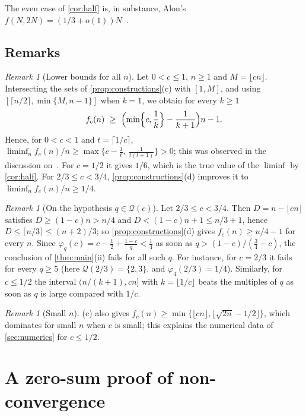 \documentclass[11pt,reqno]{amsart}
\numberwithin{equation}{section}
\theoremstyle{definition}
\theoremstyle{remark}
\newtheorem{remark}[theorem]{Remark}
\newcommand{\floor}[1]{\lfloor #1\rfloor}
\newcommand{\ceil}[1]{\lceil #1\rceil}
\begin{document}
The even case of \cref{cor:half} is, in substance, Alon's $f(N,2N)=(1/3+o(1))N$~\cite[Corollary~2.6]{Al87}.

\subsection{Remarks}

\begin{remark}[Lower bounds for all $n$]\label{rem:liminf}
Let $0<c\le1$, $n\ge1$ and $M=\floor{cn}$. Intersecting the sets of \cref{prop:constructions}(c) with $[1,M]$, and using $[\ceil{n/2},\min\{M,n-1\}]$ when $k=1$, we obtain for every $k\ge1$
\[
 f_c(n)\ \ge\ \Bigl(\min\Bigl\{c,\frac1k\Bigr\}-\frac1{k+1}\Bigr)n-1 .
\]
Hence, for $0<c<1$ and $t=\ceil{1/c}$, $\liminf_{n}f_c(n)/n\ge\max\{c-\frac1t,\ \frac1{t(t+1)}\}>0$; this was observed in the discussion on~\cite{Bl}. For $c=1/2$ it gives $1/6$, which is the true value of the $\liminf$ by \cref{cor:half}. For $2/3\le c<3/4$, \cref{prop:constructions}(d) improves it to $\liminf_n f_c(n)/n\ge1/4$.
\end{remark}

\begin{remark}[On the hypothesis $q\in\mathcal Q(c)$]\label{rem:intervals}
Let $2/3\le c<3/4$. Then $D=n-\floor{cn}$ satisfies $D\ge(1-c)n>n/4$ and $D<(1-c)n+1\le n/3+1$, hence $D\le\ceil{n/3}\le(n+2)/3$; so \cref{prop:constructions}(d) gives $f_c(n)\ge n/4-1$ for every $n$. Since $\varphi_q(c)=c-\frac12+\frac{1-c}q<\frac14$ as soon as $q>(1-c)/(\frac34-c)$, the conclusion of \cref{thm:main}(ii) fails for all such $q$. For instance, for $c=2/3$ it fails for every $q\ge5$ (here $\mathcal Q(2/3)=\{2,3\}$, and $\varphi_4(2/3)=1/4$). Similarly, for $c\le1/2$ the interval $(n/(k+1),cn]$ with $k=\floor{1/c}$ beats the multiples of $q$ as soon as $q$ is large compared with $1/c$.
\end{remark}

\begin{remark}[Small $n$]
(c) also gives $f_c(n)\ge\min\{\floor{cn},\floor{\sqrt{2n}-1/2}\}$, which dominates for small $n$ when $c$ is small; this explains the numerical data of \cref{sec:numerics} for $c\le1/2$.
\end{remark}

\section{A zero-sum proof of non-convergence}\label{sec:zerosum}
\end{document}

